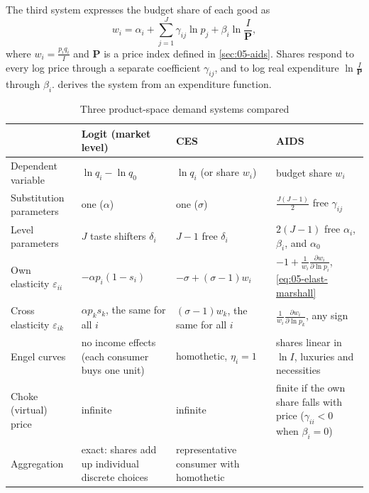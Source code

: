 The third system expresses the budget share of each good as
\begin{equation}\label{eq:05-aids-preview}
w_i = \alpha_i + \sum_{j=1}^J\gamma_{ij}\ln p_j + \beta_i\ln\frac{I}{\mathbf{P}} ,
\end{equation}
where $w_i = \frac{p_iq_i}{I}$ and $\mathbf{P}$ is a price index defined in \cref{sec:05-aids}. Shares
respond to every log price through a separate coefficient $\gamma_{ij}$, and to log real expenditure
$\ln\frac{I}{\mathbf{P}}$ through $\beta_i$.  derives the system from an expenditure
function.

\begin{table}[htbp]
\centering
\caption{Three product-space demand systems compared}\label{tab:05-three-systems}
\footnotesize
\begin{tabularx}{\textwidth}{>{\raggedright\arraybackslash}p{2.55cm}
  >{\raggedright\arraybackslash}X >{\raggedright\arraybackslash}X >{\raggedright\arraybackslash}X}
\toprule
 & Logit (market level) & CES & AIDS \\
\midrule
Dependent variable & $\ln q_i - \ln q_0$ & $\ln q_i$ (or share $w_i$) & budget share $w_i$ \\
\addlinespace
Substitution parameters & one ($\alpha$) & one ($\sigma$) & $\frac{J(J-1)}{2}$ free $\gamma_{ij}$ \\
\addlinespace
Level parameters & $J$ taste shifters $\delta_i$ & $J - 1$ free $\delta_i$ & $2(J-1)$ free $\alpha_i$,
  $\beta_i$, and $\alpha_0$ \\
\addlinespace
Own elasticity $\varepsilon_{ii}$ & $-\alpha p_i(1 - s_i)$ & $-\sigma + (\sigma - 1)w_i$ &
  $-1 + \frac{1}{w_i}\frac{\partial w_i}{\partial\ln p_i}$, \eqref{eq:05-elast-marshall} \\
\addlinespace
Cross elasticity $\varepsilon_{ik}$ & $\alpha p_ks_k$, the same for all $i$ & $(\sigma - 1)w_k$, the same
  for all $i$ & $\frac{1}{w_i}\frac{\partial w_i}{\partial\ln p_k}$, any sign \\
\addlinespace
Engel curves & no income effects (each consumer buys one unit) & homothetic, $\eta_i = 1$ & shares linear
  in $\ln I$, luxuries and necessities \\
\addlinespace
Choke (virtual) price & infinite & infinite & finite if the own share falls with price ($\gamma_{ii} < 0$
  when $\beta_i = 0$) \\
\addlinespace
Aggregation & exact: shares add up individual discrete choices & representative consumer with homothetic

\end{tabularx}
\end{table}
